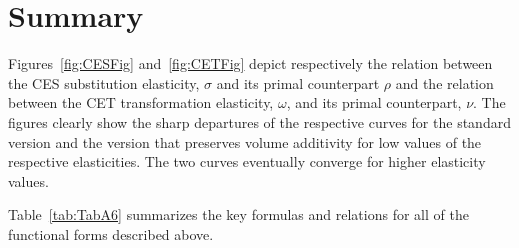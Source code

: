 \section{Summary}

Figures~\ref{fig:CESFig} and~\ref{fig:CETFig} depict respectively the relation
between the CES substitution elasticity, $\sigma$ and its primal counterpart
$\rho$ and the relation between the CET transformation elasticity, $\omega$,
and its primal counterpart, $\nu$. The figures clearly show the sharp departures
of the respective curves for the standard version and the version that
preserves volume additivity for low values of the respective elasticities.
The two curves eventually converge for higher elasticity values.

Table~\ref{tab:TabA6} summarizes the key formulas and relations
for all of the functional forms described above.

